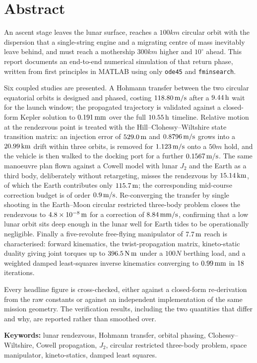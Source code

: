 \section*{Abstract}

\noindent
An ascent stage leaves the lunar surface, reaches a $100\unit{km}$ circular orbit
with the dispersion that a single-string engine and a migrating centre of mass
inevitably leave behind, and must reach a mothership $300\unit{km}$ higher and
$10^\circ$ ahead. This report documents an end-to-end numerical simulation of
that return phase, written from first principles in MATLAB using only
\texttt{ode45} and \texttt{fminsearch}.

Six coupled studies are presented. A Hohmann transfer between the two circular
equatorial orbits is designed and phased, costing $118.80\,\mathrm{m/s}$ after a
$9.44\,\mathrm{h}$ wait for the launch window; the propagated trajectory is
validated against a closed-form Kepler solution to $0.191\,\mathrm{mm}$ over
the full $10.55\,\mathrm{h}$ timeline. Relative motion at the rendezvous point
is treated with the Hill--Clohessy--Wiltshire state transition matrix: an
injection error of $529.0\,\mathrm{m}$ and $0.8796\,\mathrm{m/s}$ grows into a
$20.99\,\mathrm{km}$ drift within three orbits, is removed for $1.123\,\mathrm{m/s}$
onto a $50\unit{m}$ \vbar{} hold, and the vehicle is then walked to the docking
port for a further $0.1567\,\mathrm{m/s}$. The same manoeuvre plan flown against a
Cowell model with lunar $J_2$ and the Earth as a third body, deliberately without
retargeting, misses the rendezvous by $15.14\,\mathrm{km}$, of which the Earth
contributes only $115.7\,\mathrm{m}$; the corresponding mid-course correction
budget is of order $0.9\,\mathrm{m/s}$. Re-converging the transfer by single
shooting in the Earth--Moon circular restricted three-body problem closes the
rendezvous to $4.8\times 10^{-8}\,\mathrm{m}$ for a correction of $8.84\,\mathrm{mm/s}$,
confirming that a low lunar orbit sits deep enough in the lunar well for Earth
tides to be operationally negligible. Finally a five-revolute free-flying
manipulator of $7.7\,\mathrm{m}$ reach is characterised: forward kinematics, the
twist-propagation matrix, kineto-static duality giving joint torques up to
$396.5\,\mathrm{N\,m}$ under a $100\unit{N}$ berthing load, and a weighted damped
least-squares inverse kinematics converging to $0.99\,\mathrm{mm}$ in
$18$ iterations.

Every headline figure is cross-checked, either against a closed-form
re-derivation from the raw constants or against an independent implementation of
the same mission geometry. The verification results, including the two
quantities that differ and why, are reported rather than smoothed over.

\vspace{3mm}
\noindent\textbf{Keywords:} lunar rendezvous, Hohmann transfer, orbital phasing,
Clohessy--Wiltshire, Cowell propagation, $J_2$, circular restricted three-body
problem, space manipulator, kineto-statics, damped least squares.
